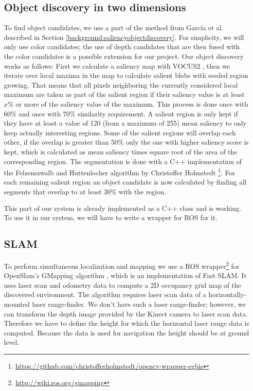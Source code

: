 \documentclass[a4paper,11pt,english]{article}
\begin{document}
\subsection{Object discovery in two dimensions}
\label{system:obj_discovery}
To find object candidates, we use a part of the method from García et al. described in Section \ref{background:saliencyobjectdiscovery}.
For simplicity, we will only use color candidates; the use of depth candidates that are then fused with the color candidates is a possible extension for our project.
Our object discovery works as follows: First we calculate a saliency map with VOCUS2 \cite{frintrop2015traditional}, then we iterate over local maxima in the map to calculate salient blobs with seeded region growing.
That means that all pixels neighboring the currently considered local maximum are taken as part of the salient region if their saliency value is at least \(x\)\% or more of the saliency value of the maximum.
This process is done once with 60\% and once with 70\% similarity requirement.
A salient region is only kept if they have at least a value of 120 (from a maximum of 255) mean saliency to only keep actually interesting regions.
Some of the salient regions will overlap each other, if the overlap is greater than 50\% only the one with higher saliency score is kept, which is calculated as mean saliency times square root of the area of the corresponding region.
The segmentation is done with a C++ implementation of the Felzenszwalb and Huttenlocher algorithm \cite{felzenszwalb2004efficient} by Christoffer Holmstedt \footnote{\url{https://github.com/christofferholmstedt/opencv-wrapper-egbis}}.
For each remaining salient region an object candidate is now calculated by finding all segments that overlap to at least 30\% with the region.

This part of our system is already implemented as a C++ class and is working. To use it in our system, we will have to write a wrapper for ROS for it.

\subsection{SLAM}
\label{system:slam}
To perform simultaneous localization and mapping we use a ROS wrapper\footnote{\url{http://wiki.ros.org/gmapping}} for OpenSlam's GMapping algorithm \cite{grisetti2007}, which is an implementation of Fast SLAM.
It uses laser scan and odometry data to compute a 2D occupancy grid map of the discovered environment.
The algorithm requires laser scan data of a horizontally-mounted laser range-finder.
We don't have such a laser range-finder; however, we can transform the depth image provided by the Kinect camera to laser scan data.
Therefore we have to define the height for which the horizontal laser range data is computed.
Because the data is used for navigation the height should be at ground level.
\end{document}
